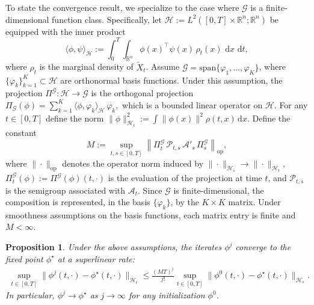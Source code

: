 \documentclass[letterpaper, 10 pt, conference]{ieeeconf}  %
\def\Re{\mathbb{R}}
\newcommand{\field}[1]{\mathbb{#1}}
\def\Re{\field{R}}
\newtheorem{proposition}{Proposition}
\newcommand{\ud}{\,\mathrm{d}}
\def\Re{\mathbb{R}}
\renewcommand{\Re}{\mathbb{R}}
\begin{document}
To state the convergence result, we specialize to the case where $\mathcal{G}$ 
is a finite-dimensional function class. Specifically, let $\mathcal{H}:=L^2([0,T]\times\Re^n; \Re^n)$ be equipped with the inner product
\[
    \langle \phi, \psi \rangle_{\mathcal{H}} 
    := \int_0^T\int_{\mathbb{R}^n} \phi(x)^\top \psi(x)\, \rho_t(x)\, \ud x\,\ud t ,
\]
where $\rho_t$ is the marginal density of $\tilde{X}_t$. Assume $\mathcal{G} = 
\mathrm{span}\{\varphi_1,\ldots,\varphi_K\}$, where $\{\varphi_k\}_{k=1}^K 
\subset \mathcal{H}$ are orthonormal basis functions. Under this assumption, 
the projection $\Pi^{\mathcal{G}} : \mathcal{H} \to \mathcal{G}$ is the 
orthogonal projection
$
    \Pi_{\mathcal{G}}(\phi) = \sum_{k=1}^K \langle \phi, \varphi_k 
    \rangle_{\mathcal{H}}\, \varphi_k,
$
which is a bounded linear operator on $\mathcal{H}$. For any $t\in [0,T]$ define the norm $\|\phi\|_{\mathcal H_t}^2:=\int \|\phi(x)\|^2\rho(t,x)\ud x$. Define the constant
\begin{equation}\label{eq:M}
    M := \sup_{t,s \in [0,T]} \left\| \Pi_t^{\mathcal{G}}\, 
    \mathcal{P}_{t,s}\, \mathcal{A}'_s\,  \Pi_s^{\mathcal{G}} 
    \right\|_{\mathrm{op}},
\end{equation}
where $\|\cdot\|_{\mathrm{op}}$ denotes the operator norm induced by $\| \cdot\|_{\mathcal H_s} \to \|\cdot\|_{\mathcal H_t}$, $\Pi^{\mathcal G}_t(\phi):=\Pi^{\mathcal G}(\phi)(t,\cdot)$ is the evaluation of the projection at time $t$, and 
$\mathcal{P}_{t,s}$ is the semigroup associated with $\mathcal{A}_t$. Since 
$\mathcal{G}$ is finite-dimensional, the composition is represented, 
in the basis $\{\varphi_k\}$, by the $K\times K$ matrix. 
Under smoothness assumptions on the basis functions, each matrix entry is 
finite and $M < \infty$.

\begin{proposition}\label{prop:convergence}
Under the above assumptions, the iterates $\phi^j$ converge to the fixed 
point $\phi^\star$ at a superlinear rate:
\begin{align*}
    \sup_{t\in[0,T]}\|\phi^j(t,\cdot) - \phi^\star(t,\cdot)\|_{\mathcal{H}_t} 
    \leq \frac{(MT)^j}{j!}\sup_{t\in[0,T]}
    \|\phi^0(t,\cdot) - \phi^\star(t,\cdot)\|_{\mathcal{H}_s}.
\end{align*}
In particular, $\phi^j \to \phi^\star$ as $j\to\infty$ for any initialization 
$\phi^0$.
\end{proposition}
\end{document}
